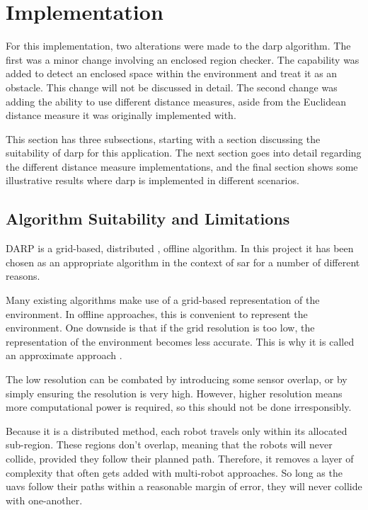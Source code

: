 \section{Implementation}
\label{sec:DARP implement}
For this implementation, two alterations were made to the \ac{darp} algorithm. The first was a minor change involving an enclosed region checker. The capability was added to detect an enclosed space within the environment and treat it as an obstacle. This change will not be discussed in detail. The second change was adding the ability to use different distance measures, aside from the Euclidean distance measure it was originally implemented with. 

This section has three subsections, starting with a section discussing the suitability of \ac{darp} for this application. The next section goes into detail regarding the different distance measure implementations, and the final section shows some illustrative results where \ac{darp} is implemented in different scenarios.
\subsection{Algorithm Suitability and Limitations}
DARP is a grid-based, distributed , offline algorithm. In this project it has been chosen as an appropriate algorithm in the context of \ac{sar} for a number of different reasons. 

Many existing algorithms make use of a grid-based representation of the environment. In offline approaches, this is convenient to represent the environment. One downside is that if the grid resolution is too low, the representation of the environment becomes less accurate. This is why it is called an approximate approach \cite{Choset2001}. 

The low resolution can be combated by introducing some sensor overlap, or by simply ensuring the resolution is very high. However, higher resolution means more computational power is required, so this should not be done irresponsibly.

Because it is a distributed method, each robot travels only within its allocated sub-region. These regions don't overlap, meaning that the robots will never collide, provided they follow their planned path. Therefore, it removes a layer of complexity that often gets added with multi-robot approaches. So long as the \acp{uav} follow their paths within a reasonable margin of error, they will never collide with one-another.

